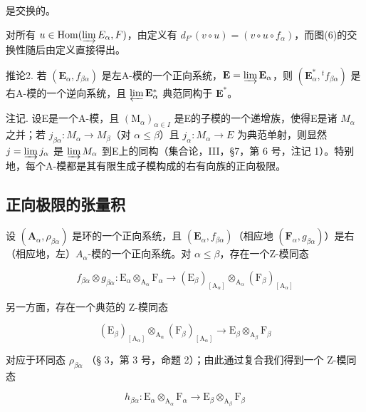 是交换的。

对所有 \(u \in \operatorname{Hom}(\varinjlim E_{\alpha}, F)\)，由定义有 \(d_{F'}(v \circ u) = (v \circ u \circ f_{\alpha})\)，而图(6)的交换性随后由定义直接得出。

推论2. 若 \((\mathbf{E}_{\alpha}, f_{\beta \alpha})\) 是左A-模的一个正向系统，\(\mathbf{E} = \varinjlim \mathbf{E}_{\alpha}\)，则 \((\mathbf{E}_{\alpha}^{*}, {}^t f_{\beta \alpha})\) 是右A-模的一个逆向系统，且 \(\varprojlim \mathbf{E}_{\alpha}^{*}\) 典范同构于 \(\mathbf{E}^{*}\)。

注记. 设E是一个A-模，且 \((\mathrm{M}_{\alpha})_{\alpha\in I}\) 是E的子模的一个递增族，使得E是诸 \(M_{\alpha}\) 之并；若 \(j_{\beta\alpha}:M_{\alpha}\to M_{\beta}\)（对 \(\alpha\leqslant\beta\)）且 \(j_{\alpha}:M_{\alpha}\to E\) 为典范单射，则显然 \(j=\varinjlim j_{\alpha}\) 是 \(\varinjlim M_{\alpha}\) 到E上的同构（集合论，III，§7，第 6 号，注记 1）。特别地，每个A-模都是其有限生成子模构成的右有向族的正向极限。

\subsection{正向极限的张量积}

设 \((\mathbf{A}_{\alpha}, \rho_{\beta\alpha})\) 是环的一个正向系统，且 \((\mathbf{E}_{\alpha}, f_{\beta\alpha})\)（相应地 \((\mathbf{F}_{\alpha}, g_{\beta\alpha})\)）是右（相应地，左）\(A_{\alpha}\)-模的一个正向系统。对 \(\alpha \leqslant \beta\)，存在一个Z-模同态

\[
f _ {\beta \alpha} \otimes g _ {\beta \alpha}: \mathrm{E} _ {\alpha} \otimes_ {\mathrm{A} _ {\alpha}} \mathrm{F} _ {\alpha} \rightarrow (\mathrm{E} _ {\beta}) _ {[ \mathrm{A} _ {\alpha} ]} \otimes_ {\mathrm{A} _ {\alpha}} (\mathrm{F} _ {\beta}) _ {[ \mathrm{A} _ {\alpha} ]}
\]

另一方面，存在一个典范的 Z-模同态

\[
\left(\mathrm{E} _ {\beta}\right) _ {[ \mathrm{A} _ {\alpha} ]} \otimes_ {\mathrm{A} _ {\alpha}} \left(\mathrm{F} _ {\beta}\right) _ {[ \mathrm{A} _ {\alpha} ]} \rightarrow \mathrm{E} _ {\beta} \otimes_ {\mathrm{A} _ {\beta}} \mathrm{F} _ {\beta}
\]

对应于环同态 \(\rho_{\beta \alpha}\) （§ 3，第 3 号，命题 2）；由此通过复合我们得到一个 Z-模同态

\[
h _ {\beta \alpha}: \mathrm{E} _ {\alpha} \otimes_ {\mathrm{A} _ {\alpha}} \mathrm{F} _ {\alpha} \rightarrow \mathrm{E} _ {\beta} \otimes_ {\mathrm{A} _ {\beta}} \mathrm{F} _ {\beta}
\]

